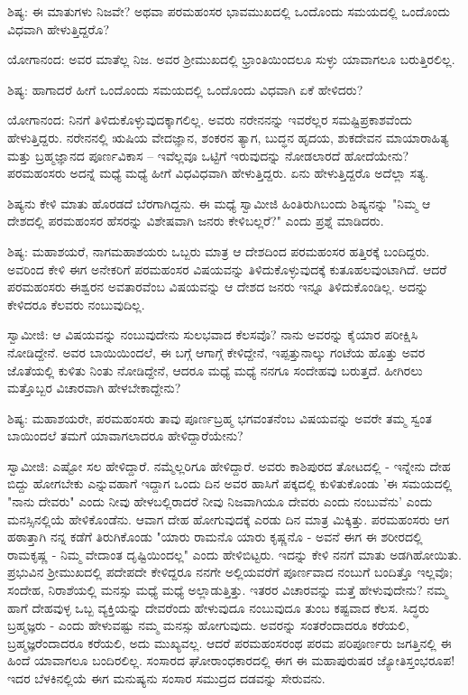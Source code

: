ಶಿಷ್ಯ: ಈ ಮಾತುಗಳು ನಿಜವೇ? ಅಥವಾ ಪರಮಹಂಸರ ಭಾವಮುಖದಲ್ಲಿ ಒಂದೊಂದು ಸಮಯದಲ್ಲಿ ಒಂದೊಂದು ವಿಧವಾಗಿ ಹೇಳುತ್ತಿದ್ದರೊ?

ಯೋಗಾನಂದ: ಅವರ ಮಾತೆಲ್ಲ ನಿಜ. ಅವರ ಶ‍್ರೀಮುಖದಲ್ಲಿ ಭ್ರಾಂತಿಯಿಂದಲೂ ಸುಳ್ಳು ಯಾವಾಗಲೂ ಬರುತ್ತಿರಲಿಲ್ಲ.

ಶಿಷ್ಯ: ಹಾಗಾದರೆ ಹೀಗೆ ಒಂದೊಂದು ಸಮಯದಲ್ಲಿ ಒಂದೊಂದು ವಿಧವಾಗಿ ಏಕೆ ಹೇಳಿದರು?

ಯೋಗಾನಂದ: ನಿನಗೆ ತಿಳಿದುಕೊಳ್ಳುವುದಕ್ಕಾಗಲಿಲ್ಲ. ಅವರು ನರೇನನನ್ನು ಇವರೆಲ್ಲರ ಸಮಷ್ಟಿಪ್ರಕಾಶವೆಂದು ಹೇಳುತ್ತಿದ್ದರು. ನರೇನನಲ್ಲಿ ಋಷಿಯ ವೇದಜ್ಞಾನ, ಶಂಕರನ ತ್ಯಾಗ, ಬುದ್ಧನ ಹೃದಯ, ಶುಕದೇವನ ಮಾಯಾರಾಹಿತ್ಯ ಮತ್ತು ಬ್ರಹ್ಮಜ್ಞಾನದ ಪೂರ್ಣವಿಕಾಸ – ಇವೆಲ್ಲವೂ ಒಟ್ಟಿಗೆ ಇರುವುದನ್ನು ನೋಡಲಾರದೆ ಹೋದೆಯೇನು? ಪರಮಹಂಸರು ಅದನ್ನೆ ಮಧ್ಯೆ ಮಧ್ಯೆ ಹೀಗೆ ವಿಧವಿಧವಾಗಿ ಹೇಳುತ್ತಿದ್ದರು. ಏನು ಹೇಳುತ್ತಿದ್ದರೊ ಅದೆಲ್ಲಾ ಸತ್ಯ.

ಶಿಷ್ಯನು ಕೇಳಿ ಮಾತು ಹೊರಡದೆ ಬೆರಗಾಗಿದ್ದನು. ಈ ಮಧ್ಯೆ ಸ್ವಾಮೀಜಿ ಹಿಂತಿರುಗಿಬಂದು ಶಿಷ್ಯನನ್ನು "ನಿಮ್ಮ ಆ ದೇಶದಲ್ಲಿ ಪರಮಹಂಸರ ಹೆಸರನ್ನು ವಿಶೇಷವಾಗಿ ಜನರು ಕೇಳಿಬಲ್ಲರೆ?" ಎಂದು ಪ್ರಶ್ನೆ ಮಾಡಿದರು.

ಶಿಷ್ಯ: ಮಹಾಶಯರೆ, ನಾಗಮಹಾಶಯರು ಒಬ್ಬರು ಮಾತ್ರ ಆ ದೇಶದಿಂದ ಪರಮಹಂಸರ ಹತ್ತಿರಕ್ಕೆ ಬಂದಿದ್ದರು. ಅವರಿಂದ ಕೇಳಿ ಈಗ ಅನೇಕರಿಗೆ ಪರಮಹಂಸರ ವಿಷಯವನ್ನು ತಿಳಿದುಕೊಳ್ಳುವುದಕ್ಕೆ ಕುತೂಹಲವುಂಟಾಗಿದೆ. ಆದರೆ ಪರಮಹಂಸರು ಈಶ್ವರನ ಅವತಾರವೆಂಬ ವಿಷಯವನ್ನು ಆ ದೇಶದ ಜನರು ಇನ್ನೂ ತಿಳಿದುಕೊಂಡಿಲ್ಲ. ಅದನ್ನು ಕೇಳಿದರೂ ಕೆಲವರು ನಂಬುವುದಿಲ್ಲ.

ಸ್ವಾಮೀಜಿ: ಆ ವಿಷಯವನ್ನು ನಂಬುವುದೇನು ಸುಲಭವಾದ ಕೆಲಸವೊ? ನಾನು ಅವರನ್ನು ಕೈಯಾರ ಪರೀಕ್ಷಿಸಿ ನೋಡಿದ್ದೇನೆ. ಅವರ ಬಾಯಿಯಿಂದಲೆ, ಈ ಬಗ್ಗೆ ಆಗಾಗ್ಗೆ ಕೇಳಿದ್ದೇನೆ, ಇಪ್ಪತ್ತುನಾಲ್ಕು ಗಂಟೆಯ ಹೊತ್ತು ಅವರ ಜೊತೆಯಲ್ಲಿ ಕುಳಿತು ನಿಂತು ನೋಡಿದ್ದೇನೆ, ಆದರೂ ಮಧ್ಯೆ ಮಧ್ಯೆ ನನಗೂ ಸಂದೇಹವು ಬರುತ್ತದೆ. ಹೀಗಿರಲು ಮತ್ತೊಬ್ಬರ ವಿಚಾರವಾಗಿ ಹೇಳಬೇಕಾದ್ದೇನು?

ಶಿಷ್ಯ: ಮಹಾಶಯರೇ, ಪರಮಹಂಸರು ತಾವು ಪೂರ್ಣಬ್ರಹ್ಮ ಭಗವಂತನೆಂಬ ವಿಷಯವನ್ನು ಅವರೇ ತಮ್ಮ ಸ್ವಂತ ಬಾಯಿಂದಲೆ ತಮಗೆ ಯಾವಾಗಲಾದರೂ ಹೇಳಿದ್ದಾರೆಯೇನು?

ಸ್ವಾಮೀಜಿ: ಎಷ್ಟೋ ಸಲ ಹೇಳಿದ್ದಾರೆ. ನಮ್ಮೆಲ್ಲರಿಗೂ ಹೇಳಿದ್ದಾರೆ. ಅವರು ಕಾಶಿಪುರದ ತೋಟದಲ್ಲಿ - ಇನ್ನೇನು ದೇಹ ಬಿದ್ದು ಹೋಗಬೇಕು ಎನ್ನುವಹಾಗೆ ಇದ್ದಾಗ ಒಂದು ದಿನ ಅವರ ಹಾಸಿಗೆ ಪಕ್ಕದಲ್ಲಿ ಕುಳಿತುಕೊಂಡು 'ಈ ಸಮಯದಲ್ಲಿ "ನಾನು ದೇವರು" ಎಂದು ನೀವು ಹೇಳಬಲ್ಲಿರಾದರೆ ನೀವು ನಿಜವಾಗಿಯೂ ದೇವರು ಎಂದು ನಂಬುವೆನು' ಎಂದು ಮನಸ್ಸಿನಲ್ಲಿಯೆ ಹೇಳಿಕೊಂಡೆನು. ಆವಾಗ ದೇಹ ಹೋಗುವುದಕ್ಕೆ ಎರಡು ದಿನ ಮಾತ್ರ ಮಿಕ್ಕಿತ್ತು. ಪರಮಹಂಸರು ಆಗ ಹಠಾತ್ತಾಗಿ ನನ್ನ ಕಡೆಗೆ ತಿರುಗಿಕೊಂಡು "ಯಾರು ರಾಮನೊ ಯಾರು ಕೃಷ್ಣನೊ - ಅವನೆ ಈಗ ಈ ಶರೀರದಲ್ಲಿ ರಾಮಕೃಷ್ಣ - ನಿಮ್ಮ ವೇದಾಂತ ದೃಷ್ಟಿಯಿಂದಲ್ಲ" ಎಂದು ಹೇಳಿಬಿಟ್ಟರು. ಇದನ್ನು ಕೇಳಿ ನನಗೆ ಮಾತು ಅಡಗಿಹೋಯಿತು. ಪ್ರಭುವಿನ ಶ‍್ರೀಮುಖದಲ್ಲಿ ಪದೇಪದೇ ಕೇಳಿದ್ದರೂ ನನಗೇ ಅಲ್ಲಿಯವರೆಗೆ ಪೂರ್ಣವಾದ ನಂಬುಗೆ ಬಂದಿತ್ತೊ ಇಲ್ಲವೊ; ಸಂದೇಹ, ನಿರಾಶೆಯಲ್ಲಿ ಮನಸ್ಸು ಮಧ್ಯೆ ಮಧ್ಯೆ ಅಲ್ಲಾಡುತ್ತಿತ್ತು. ಇತರರ ವಿಚಾರವನ್ನು ಮತ್ತೆ ಹೇಳುವುದೇನು? ನಮ್ಮ ಹಾಗೆ ದೇಹವುಳ್ಳ ಒಬ್ಬ ವ್ಯಕ್ತಿಯನ್ನು ದೇವರೆಂದು ಹೇಳುವುದೂ ನಂಬುವುದೂ ತುಂಬ ಕಷ್ಟವಾದ ಕೆಲಸ. ಸಿದ್ಧರು ಬ್ರಹ್ಮಜ್ಞರು - ಎಂದು ಹೇಳುವಷ್ಟು ನಮ್ಮ ಮನಸ್ಸು ಹೋಗುವುದು. ಅವರನ್ನು ಸಂತರೆಂದಾದರೂ ಕರೆಯಲಿ, ಬ್ರಹ್ಮಜ್ಞರೆಂದಾದರೂ ಕರೆಯಲಿ, ಅದು ಮುಖ್ಯವಲ್ಲ. ಆದರೆ ಪರಮಹಂಸರಂಥ ಪರಮ ಪರಿಪೂರ್ಣರು ಜಗತ್ತಿನಲ್ಲಿ ಈ ಹಿಂದೆ ಯಾವಾಗಲೂ ಬಂದಿರಲಿಲ್ಲ. ಸಂಸಾರದ ಘೋರಾಂಧಕಾರದಲ್ಲಿ ಈಗ ಈ ಮಹಾಪುರುಷರ ಜ್ಯೋತಿಸ್ತಂಭರೂಪ! ಇದರ ಬೆಳಕಿನಲ್ಲಿಯೆ ಈಗ ಮನುಷ್ಯನು ಸಂಸಾರ ಸಮುದ್ರದ ದಡವನ್ನು ಸೇರುವನು.

